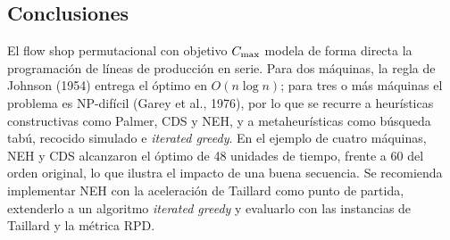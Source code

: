 \subsection{Conclusiones}

El flow shop permutacional con objetivo $C_{\max}$ modela de forma directa la programación
de líneas de producción en serie. Para dos máquinas, la regla de Johnson (1954) entrega el
óptimo en $O(n\log n)$; para tres o más máquinas el problema es NP-difícil (Garey et al.,
1976), por lo que se recurre a heurísticas constructivas como Palmer, CDS y NEH, y a
metaheurísticas como búsqueda tabú, recocido simulado e \textit{iterated greedy}. En el
ejemplo de cuatro máquinas, NEH y CDS alcanzaron el óptimo de 48 unidades de tiempo, frente
a 60 del orden original, lo que ilustra el impacto de una buena secuencia. Se recomienda
implementar NEH con la aceleración de Taillard como punto de partida, extenderlo a un
algoritmo \textit{iterated greedy} y evaluarlo con las instancias de Taillard y la métrica
RPD.

\newpage
